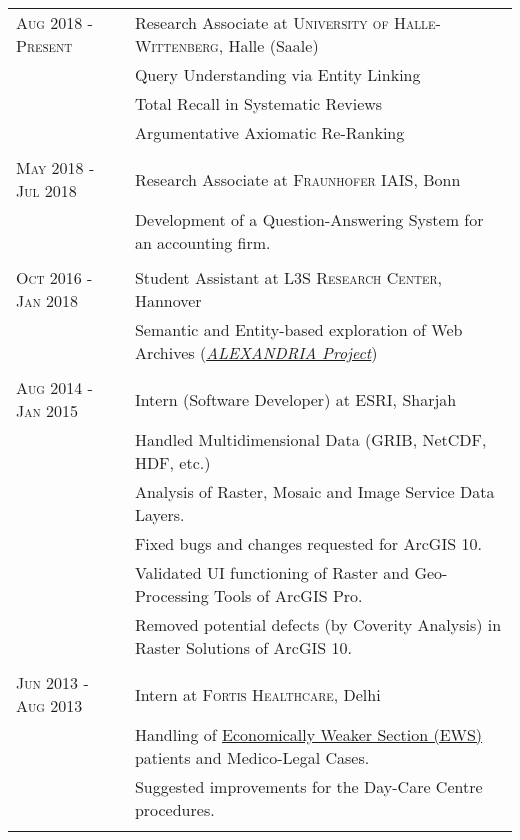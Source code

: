 \documentclass[a4paper,10pt]{article} %
\begin{document}
\begin{tabular}{l|p{11cm}}
\textsc{Aug 2018 - Present} & Research Associate at \textsc{University of Halle-Wittenberg}, Halle (Saale)
\\
& \footnotesize{Query Understanding via Entity Linking}\\
& \footnotesize{Total Recall in Systematic Reviews}\\
& \footnotesize{Argumentative Axiomatic Re-Ranking}\\
\multicolumn{2}{c}{} \\


\textsc{May 2018 - Jul 2018} & Research Associate at \textsc{Fraunhofer IAIS}, Bonn
\\
& \footnotesize{Development of a Question-Answering System for an accounting firm.}\\
\multicolumn{2}{c}{} \\


\textsc{Oct 2016 - Jan 2018} & Student Assistant at \textsc{L3S Research Center}, Hannover
\\
& \footnotesize{Semantic and Entity-based exploration of Web Archives (\href{http://alexandria-project.eu/}{\emph{ALEXANDRIA Project}}})\\
\multicolumn{2}{c}{} \\


\textsc{Aug 2014 - Jan 2015} & Intern (Software Developer) at \textsc{ESRI}, Sharjah \\
& \footnotesize{Handled Multidimensional Data (GRIB, NetCDF, HDF, etc.)}\\
& \footnotesize{Analysis of Raster, Mosaic and Image Service Data Layers.}\\
& \footnotesize{Fixed bugs and changes requested for ArcGIS 10.}\\
& \footnotesize{Validated UI functioning of Raster and Geo-Processing Tools of ArcGIS Pro.}\\
& \footnotesize{Removed potential defects (by Coverity Analysis) in Raster Solutions of ArcGIS 10.}\\
\multicolumn{2}{c}{} \\


\textsc{Jun 2013 - Aug 2013} & Intern at \textsc{Fortis Healthcare}, Delhi \\
& \footnotesize{Handling of \href{https://en.wikipedia.org/wiki/Economically_Weaker_Section}{Economically Weaker Section (EWS)} patients and Medico-Legal Cases.}\\
& \footnotesize{Suggested improvements for the Day-Care Centre procedures.}\\
\multicolumn{2}{c}{} \\


\end{tabular}
\end{document}

